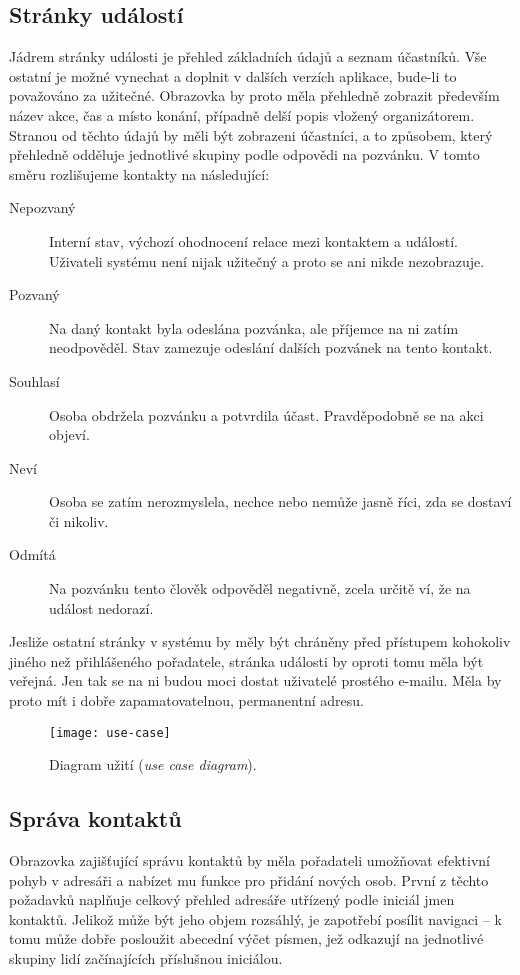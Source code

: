 \documentclass[12pt,oneside,final]{fithesis2}
\begin{document}
\subsection{Stránky událostí}
Jádrem stránky události je přehled základních údajů a seznam účastníků. Vše ostatní je možné vynechat a doplnit v dalších verzích aplikace, bude-li to považováno za užitečné. Obrazovka by proto měla přehledně zobrazit především název akce, čas a místo konání, případně delší popis vložený organizátorem. Stranou od těchto údajů by měli být zobrazeni účastníci, a to způsobem, který přehledně odděluje jednotlivé skupiny podle odpovědi na pozvánku. V tomto směru rozlišujeme kontakty na následující:

\begin{description}
    \item[Nepozvaný] Interní stav, výchozí ohodnocení relace mezi kontaktem a událostí. Uživateli systému není nijak užitečný a proto se ani nikde nezobrazuje.
    \item[Pozvaný] Na daný kontakt byla odeslána pozvánka, ale příjemce na ni zatím neodpověděl. Stav zamezuje odeslání dalších pozvánek na tento kontakt.
    \item[Souhlasí] Osoba obdržela pozvánku a potvrdila účast. Pravděpodobně se na akci objeví.
    \item[Neví] Osoba se zatím nerozmyslela, nechce nebo nemůže jasně říci, zda se dostaví či nikoliv.
    \item[Odmítá] Na pozvánku tento člověk odpověděl negativně, zcela určitě ví, že na událost nedorazí.
\end{description}

Jesliže ostatní stránky v systému by měly být chráněny před přístupem kohokoliv jiného než přihlášeného pořadatele, stránka události by oproti tomu měla být veřejná. Jen tak se na ni budou moci dostat uživatelé prostého e-mailu. Měla by proto mít i dobře zapamatovatelnou, permanentní adresu.

\begin{figure}[p]
    \centering
    \texttt{[image: use-case]}
    \caption{Diagram užití (\emph{use case diagram}).}
    \label{useCase}
\end{figure}

\subsection{Správa kontaktů}
Obrazovka zajišťující správu kontaktů by měla pořadateli umožňovat efektivní pohyb v adresáři a nabízet mu funkce pro přidání nových osob. První z těchto požadavků naplňuje celkový přehled adresáře utřízený podle iniciál jmen kontaktů. Jelikož může být jeho objem rozsáhlý, je zapotřebí posílit navigaci -- k tomu může dobře posloužit abecední výčet písmen, jež odkazují na jednotlivé skupiny lidí začínajících příslušnou iniciálou.
\end{document}
